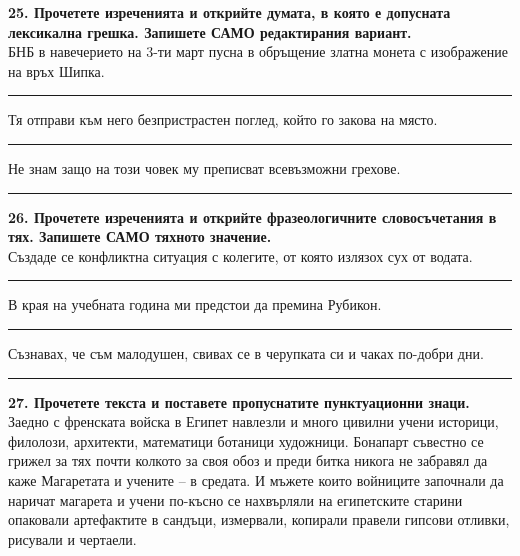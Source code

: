 \documentclass[12pt,a4paper]{article}
\begin{document}
\vspace{0.6cm}

\noindent
\textbf{25. Прочетете изреченията и открийте думата, в която е допусната лексикална грешка. Запишете САМО редактирания вариант.} \\

\vspace{-0.2cm}
\noindent
БНБ в навечерието на 3-ти март пусна в обръщение златна монета с изображение на връх Шипка.

\vspace{0.2cm}
\noindent\rule{\linewidth}{0.4pt}

\vspace{0.2cm}
\noindent
Тя отправи към него безпристрастен поглед, който го закова на място.

\vspace{0.2cm}
\noindent\rule{\linewidth}{0.4pt}

\vspace{0.2cm}
\noindent
Не знам защо на този човек му преписват всевъзможни грехове.

\vspace{0.2cm}
\noindent\rule{\linewidth}{0.4pt}

\vspace{0.6cm}

\noindent
\textbf{26. Прочетете изреченията и открийте фразеологичните словосъчетания в тях. Запишете САМО тяхното значение.} \\

\vspace{-0.2cm}
\noindent
Създаде се конфликтна ситуация с колегите, от която излязох сух от водата.

\vspace{0.2cm}
\noindent\rule{\linewidth}{0.4pt}

\vspace{0.2cm}
\noindent
В края на учебната година ми предстои да премина Рубикон.

\vspace{0.2cm}
\noindent\rule{\linewidth}{0.4pt}

\vspace{0.2cm}
\noindent
Съзнавах, че съм малодушен, свивах се в черупката си и чаках по-добри дни.

\vspace{0.2cm}
\noindent\rule{\linewidth}{0.4pt}

\vspace{0.6cm}

\noindent
\textbf{27. Прочетете текста и поставете пропуснатите пунктуационни знаци.} \\
Заедно с френската войска в Египет навлезли и много цивилни учени историци, филолози, архитекти, математици ботаници художници. Бонапарт съвестно се грижел за тях почти колкото за своя обоз и преди битка никога не забравял да каже Магаретата и учените – в средата. И мъжете които войниците започнали да наричат магарета и учени по-късно се нахвърляли на египетските старини опаковали артефактите в сандъци, измервали, копирали правели гипсови отливки, рисували и чертаели.
\end{document}

